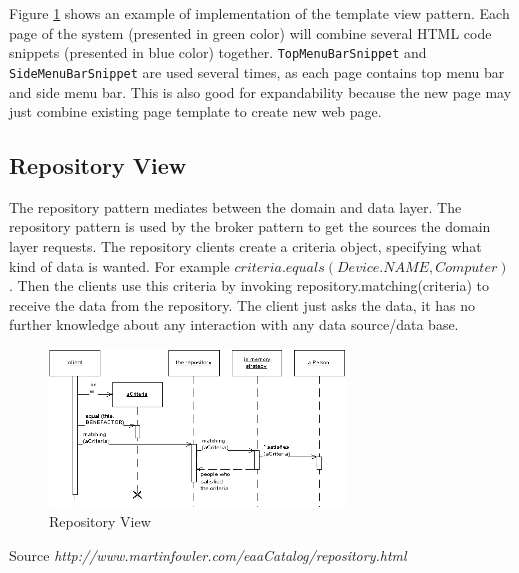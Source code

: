 Figure \ref{fig:template-view-architecture} shows an example of implementation of the template view pattern. Each page of the system (presented in green color) will combine several HTML code snippets (presented in blue color) together. \texttt{TopMenuBarSnippet} and \texttt{SideMenuBarSnippet} are used several times, as each page contains top menu bar and side menu bar. This is also good for expandability because the new page may just combine existing page template to create new web page.

\subsection{Repository View}

The repository pattern mediates between the domain and data layer. 
The repository pattern is used by the broker pattern to get the sources the domain layer requests. The repository clients create a criteria object, specifying what kind of data is wanted. For example $criteria.equals(Device.NAME, Computer)$. Then the clients use this criteria by invoking repository.matching(criteria) to receive the data from the repository. The client just asks the data, it has no further knowledge about any interaction with any data source/data base.

\begin{figure}[H]
	\centering
	\includegraphics[width=0.7\textwidth]{7-software/images/repositorySketch.png}
	\caption{Repository View}
	\label{fig:template-view-architecture}
\end{figure}

Source \textit{http://www.martinfowler.com/eaaCatalog/repository.html}


